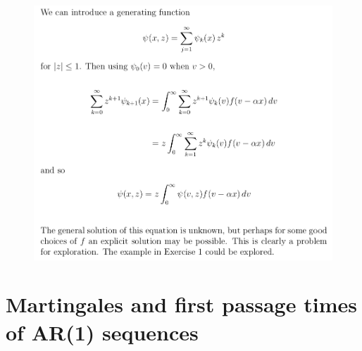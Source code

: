 \documentclass[c, dvipsnames, 8pt]{beamer}
\begin{document}
\begin{frame}[shrink=5]
	
	
	
	\frametitle{\insertsection} 
	\begin{figure}
		\centering
		\includegraphics[width=1\linewidth]{screenshot040}
		\label{fig:screenshot001}
	\end{figure}
	
	
	
\end{frame}


%
%
%	
%	
%	
%	



\section{Martingales and first passage times of AR(1) sequences}
\end{document}
